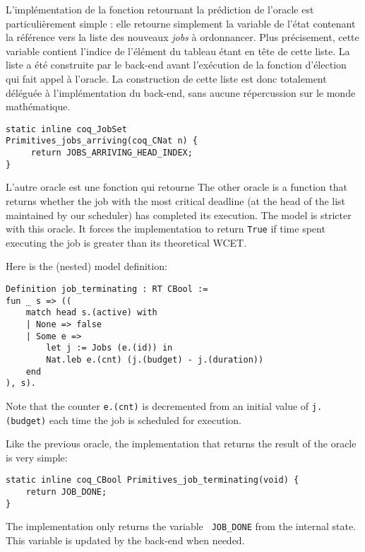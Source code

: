 	L'implémentation de la fonction retournant la prédiction de l'oracle est particulièrement simple : elle retourne simplement la variable de l'état contenant la référence vers la liste des nouveaux \emph{jobs} à ordonnancer. Plus précisement, cette variable contient l'indice de l'élément du tableau étant en tête de cette liste. La liste a été construite par le back-end avant l'exécution de la fonction d'élection qui fait appel à l'oracle. La construction de cette liste est donc totalement déléguée à l'implémentation du back-end, sans aucune répercussion sur le monde mathématique.

	\begin{verbatim}
static inline coq_JobSet
Primitives_jobs_arriving(coq_CNat n) {
     return JOBS_ARRIVING_HEAD_INDEX;
}
	\end{verbatim}

	L'autre oracle est une fonction qui retourne 
	The other oracle is a function that returns whether the job with the most critical deadline (at the head of the list maintained by our scheduler) has completed its execution. The model is stricter with this oracle. It forces the implementation to return \texttt{True} if time spent executing the job is greater than its theoretical WCET.

	Here is the (nested) model definition:

	\begin{verbatim}
Definition job_terminating : RT CBool :=
fun _ s => ((
    match head s.(active) with
    | None => false
    | Some e =>
        let j := Jobs (e.(id)) in
        Nat.leb e.(cnt) (j.(budget) - j.(duration))
    end
), s).
	\end{verbatim}

	Note that the counter \texttt{e.(cnt)} is decremented from an initial value of \texttt{j.(budget)} each time the job is scheduled for execution. 

	Like the previous oracle, the implementation that returns the result of the oracle is very simple:

	\begin{verbatim}
static inline coq_CBool Primitives_job_terminating(void) {
    return JOB_DONE;
}
	\end{verbatim}

	The implementation only returns the variable \texttt{ JOB\_DONE} from the internal state. This variable is updated by the back-end when needed.

